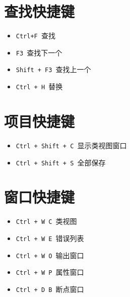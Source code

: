 \documentclass[UTF8,a4paper,12pt]{ctexbook}
\begin{document}
	\section{查找快捷键}
		\begin{itemize}
			\item \verb|Ctrl+F |查找
			\item \verb|F3 |查找下一个
			\item \verb|Shift + F3 |查找上一个
			\item \verb|Ctrl + H |替换
		\end{itemize}
	
	\section{项目快捷键}
		\begin{itemize}
			\item \verb|Ctrl + Shift + C |显示类视图窗口
			\item \verb|Ctrl + Shift + S |全部保存
		\end{itemize}
	
	\section{窗口快捷键}  
		\begin{itemize}
			\item \verb|Ctrl + W C |类视图
			\item \verb|Ctrl + W E |错误列表
			\item \verb|Ctrl + W O |输出窗口
			\item \verb|Ctrl + W P |属性窗口
			\item \verb|Ctrl + D B |断点窗口
		\end{itemize}	    
\end{document}
